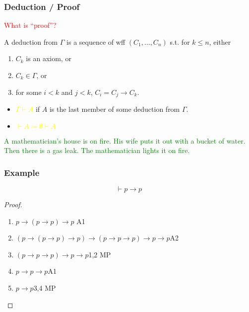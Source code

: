 \documentclass[UTF8,11pt,colorlinks,compress,openany]{beamer}%
\begin{document}
\begin{frame}\frametitle{Deduction / Proof}
	\begin{center}
	\end{center}
		\begin{block}{}
			\centering\textcolor{red}{What is ``proof''?}
		\end{block}
		\begin{definition}[Deduction]
			A deduction from $\Gamma$ is a sequence of wff $(C_1,\dots, C_n)$ s.t. for $k\leq n$, either
			\begin{enumerate}
				\item $C_k$ is an axiom, or\\
				\item $C_k\in\Gamma$, or\\
				\item for some $i<k$ and $j<k$, $C_i=C_j\to C_k$.
			\end{enumerate}
		\end{definition}
		\begin{itemize}
			\item \textcolor{yellow}{$\Gamma\vdash A$} if $A$ is the last member of some deduction from $\Gamma$.
			\item \textcolor{yellow}{$\vdash A\coloneqq \emptyset\vdash A$}
		\end{itemize}
\textcolor{green}{A mathematician's house is on fire. His wife puts it out with a bucket of water. Then there is a gas leak. The mathematician lights it on fire.}
\end{frame}

\begin{frame}\frametitle{Example}
	\begin{theorem}
		\[\vdash p\to p\]
	\end{theorem}
	\begin{proof}
		\begin{enumerate}
			\item $p\to(p\to p)\to p$ \hfill A1
			\item $(p\to(p\to p)\to p)\to(p\to p\to p)\to p\to p$\hfill A2
			\item $(p\to p\to p)\to p\to p$\hfill 1,2 MP
			\item $p\to p\to p$\hfill A1
			\item $p\to p$\hfill 3,4 MP
		\end{enumerate}
	\end{proof}
\end{frame}
\end{document}
